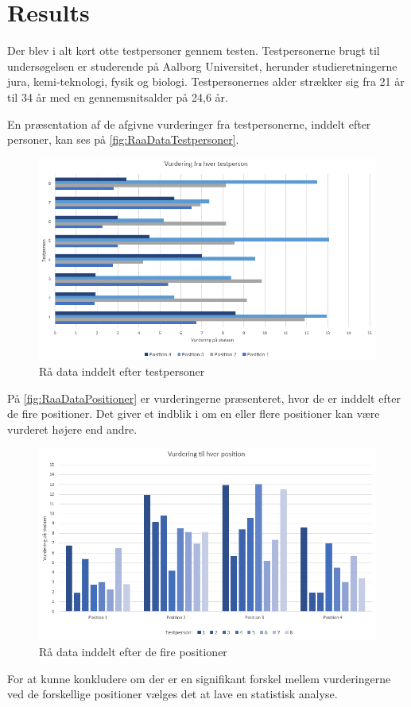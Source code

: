 \section*{Results}
\label{Results}
%
Der blev i alt kørt otte testpersoner gennem testen. Testpersonerne brugt til undersøgelsen er studerende på Aalborg Universitet, herunder studieretningerne jura, kemi-teknologi, fysik og biologi. Testpersonernes alder strækker sig fra 21 år til 34 år med en gennemsnitsalder på 24,6 år.

\noindent En præsentation af de afgivne vurderinger fra testpersonerne, inddelt efter personer, kan ses på \autoref{fig:RaaDataTestpersoner}. 

\begin{figure}[H]
\centering
\includegraphics[width = \textwidth]{Figure/RaaDataTestpersoner.PNG} 
\caption{Rå data inddelt efter testpersoner}
\label{fig:RaaDataTestpersoner}
\end{figure}
%
\noindent På \autoref{fig:RaaDataPositioner} er vurderingerne præsenteret, hvor de er inddelt efter de fire positioner. Det giver et indblik i om en eller flere positioner kan være vurderet højere end andre. 
%
\begin{figure}[H]
\centering
\includegraphics[width = \textwidth]{Figure/RaaDataPositioner.PNG} 
\caption{Rå data inddelt efter de fire positioner}
\label{fig:RaaDataPositioner}
\end{figure}
%
\noindent For at kunne konkludere om der er en signifikant forskel mellem vurderingerne ved de forskellige positioner vælges det at lave en statistisk analyse. 